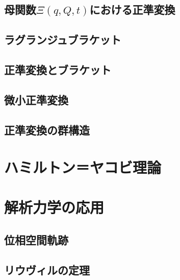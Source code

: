 \documentclass[a4paper]{jsreport}
\begin{document}
        \section{母関数$\Xi(q, Q, t)$における正準変換}
        \section{ラグランジュブラケット}
        \section{正準変換とブラケット}
        \section{微小正準変換}
        \section{正準変換の群構造}
    \chapter{ハミルトン＝ヤコビ理論}

    \chapter{解析力学の応用}
        \section{位相空間軌跡}
        \section{リウヴィルの定理}
\end{document}
